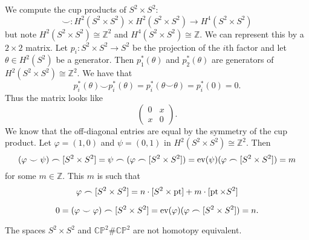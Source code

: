 \begin{example}
    We compute the cup products of $S^2 \times S^2$:
    \[ \smile: H^2(S^2 \times S^2) \times H^2(S^2 \times S^2) \to H^4(S^2 \times S^2) \]
    but note $H^2(S^2 \times S^2) \cong \mathbb Z^2$ and $H^4(S^2 \times S^2) \cong \mathbb Z$. We can represent this by a $2 \times 2$ matrix. Let $p_i: S^2 \times S^2 \to S^2$ be the projection of the $i$th factor and let $\theta \in H^2(S^2)$ be a generator. Then $p_1^*(\theta)$ and $p_2^*(\theta)$ are generators of $H^2(S^2 \times S^2) \cong \mathbb Z^2$. We have that
    \[ p_i^*(\theta)  \smile p_i^*(\theta) = p_i^*(\theta \smile \theta) = p_i^*(0) = 0. \]
    Thus the matrix looks like 
    \[
        \begin{pmatrix}
            0 & x \\ x & 0
        \end{pmatrix}.
    \]
    We know that the off-diagonal entries are equal by the symmetry of the cup product. Let $\varphi = (1,0)$ and $\psi = (0,1)$ in $H^2(S^2 \times S^2) \cong \mathbb Z^2$. Then
    \[ (\varphi \smile \psi) \frown [S^2 \times S^2] = \psi \frown (\varphi \frown [S^2 \times S^2]) = \operatorname{ev}(\psi)(\varphi \frown [S^2 \times S^2]) = m \]
    for some $m \in \mathbb Z$. This $m$ is such that
    \[ \varphi \frown [S^2 \times S^2] = n\cdot [S^2 \times \operatorname{pt}] + m \cdot [\operatorname{pt} \times S^2] \]

    \[ 0 = (\varphi \smile \varphi) \frown [S^2 \times S^2] = \operatorname{ev}(\varphi)(\varphi \frown [S^2 \times S^2]) = n. \]
\end{example}

\begin{proposition}
    The spaces $S^2 \times S^2$ and $\mathbb C \mathbb P^2 \# \mathbb C \mathbb P^2$ are not homotopy equivalent. 
\end{proposition}

